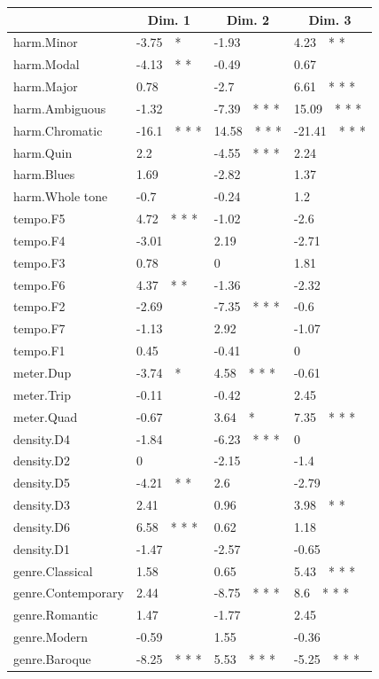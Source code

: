 \documentclass[
]{article}
\begin{document}
\begin{table}[tbp]
\begin{center}
\begin{threeparttable}
{\begin{tabular}{llll}
\toprule
 & \multicolumn{1}{c}{Dim.  1} & \multicolumn{1}{c}{Dim.  2} & \multicolumn{1}{c}{Dim.  3}\\
\midrule
harm.Minor & -3.75\ \ * & -1.93 & 4.23\ \ * *\\
harm.Modal & -4.13\ \ * * & -0.49 & 0.67\\
harm.Major & 0.78 & -2.7 & 6.61\ \ * * *\\
harm.Ambiguous & -1.32 & -7.39\ \ * * * & 15.09\ \ * * *\\
harm.Chromatic & -16.1\ \ * * * & 14.58\ \ * * * & -21.41\ \ * * *\\
harm.Quin & 2.2 & -4.55\ \ * * * & 2.24\\
harm.Blues & 1.69 & -2.82 & 1.37\\
harm.Whole tone & -0.7 & -0.24 & 1.2\\
tempo.F5 & 4.72\ \ * * * & -1.02 & -2.6\\
tempo.F4 & -3.01 & 2.19 & -2.71\\
tempo.F3 & 0.78 & 0 & 1.81\\
tempo.F6 & 4.37\ \ * * & -1.36 & -2.32\\
tempo.F2 & -2.69 & -7.35\ \ * * * & -0.6\\
tempo.F7 & -1.13 & 2.92 & -1.07\\
tempo.F1 & 0.45 & -0.41 & 0\\
meter.Dup & -3.74\ \ * & 4.58\ \ * * * & -0.61\\
meter.Trip & -0.11 & -0.42 & 2.45\\
meter.Quad & -0.67 & 3.64\ \ * & 7.35\ \ * * *\\
density.D4 & -1.84 & -6.23\ \ * * * & 0\\
density.D2 & 0 & -2.15 & -1.4\\
density.D5 & -4.21\ \ * * & 2.6 & -2.79\\
density.D3 & 2.41 & 0.96 & 3.98\ \ * *\\
density.D6 & 6.58\ \ * * * & 0.62 & 1.18\\
density.D1 & -1.47 & -2.57 & -0.65\\
genre.Classical & 1.58 & 0.65 & 5.43\ \ * * *\\
genre.Contemporary & 2.44 & -8.75\ \ * * * & 8.6\ \ * * *\\
genre.Romantic & 1.47 & -1.77 & 2.45\\
genre.Modern & -0.59 & 1.55 & -0.36\\
genre.Baroque & -8.25\ \ * * * & 5.53\ \ * * * & -5.25\ \ * * *\\

\end{tabular}}
\end{threeparttable}
\end{center}
\end{table}
\end{document}
